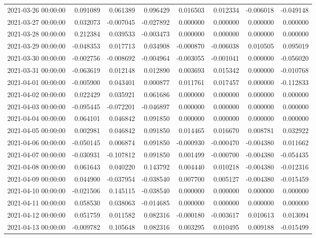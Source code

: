 \begin{tabular}{lrrrrrrr}
2021-03-26 00:00:00 & 0.091089 & 0.061389 & 0.096429 & 0.016503 & 0.012334 & -0.006018 & -0.049148 \\
2021-03-27 00:00:00 & 0.032073 & -0.007045 & -0.027892 & 0.000000 & 0.000000 & 0.000000 & 0.000000 \\
2021-03-28 00:00:00 & 0.212384 & 0.039533 & -0.003473 & 0.000000 & 0.000000 & 0.000000 & 0.000000 \\
2021-03-29 00:00:00 & -0.048353 & 0.017713 & 0.034908 & -0.000870 & -0.006038 & 0.010505 & 0.095019 \\
2021-03-30 00:00:00 & -0.002756 & -0.008692 & -0.004964 & -0.003055 & -0.001041 & 0.000000 & -0.056020 \\
2021-03-31 00:00:00 & -0.063619 & 0.012148 & 0.012890 & 0.003693 & 0.015342 & 0.000000 & -0.010768 \\
2021-04-01 00:00:00 & -0.005900 & 0.043401 & 0.000877 & 0.011761 & 0.017457 & 0.000000 & -0.112833 \\
2021-04-02 00:00:00 & 0.022429 & 0.035921 & 0.061686 & 0.000000 & 0.000000 & 0.000000 & 0.000000 \\
2021-04-03 00:00:00 & -0.095445 & -0.072201 & -0.046897 & 0.000000 & 0.000000 & 0.000000 & 0.000000 \\
2021-04-04 00:00:00 & 0.064101 & 0.046842 & 0.091850 & 0.000000 & 0.000000 & 0.000000 & 0.000000 \\
2021-04-05 00:00:00 & 0.002981 & 0.046842 & 0.091850 & 0.014465 & 0.016670 & 0.008781 & 0.032922 \\
2021-04-06 00:00:00 & -0.050145 & 0.006874 & 0.091850 & -0.000930 & -0.000470 & -0.004380 & 0.011662 \\
2021-04-07 00:00:00 & -0.030931 & -0.107812 & 0.091850 & 0.001499 & -0.000700 & -0.004380 & -0.054435 \\
2021-04-08 00:00:00 & 0.061643 & 0.040220 & 0.143792 & 0.004440 & 0.010218 & -0.004380 & -0.012316 \\
2021-04-09 00:00:00 & 0.044900 & -0.037954 & -0.038540 & 0.007700 & 0.005127 & -0.004380 & -0.015459 \\
2021-04-10 00:00:00 & -0.021506 & 0.145115 & -0.038540 & 0.000000 & 0.000000 & 0.000000 & 0.000000 \\
2021-04-11 00:00:00 & 0.058530 & 0.038063 & -0.014685 & 0.000000 & 0.000000 & 0.000000 & 0.000000 \\
2021-04-12 00:00:00 & 0.051759 & 0.011582 & 0.082316 & -0.000180 & -0.003617 & 0.010613 & 0.013094 \\
2021-04-13 00:00:00 & -0.009782 & 0.105648 & 0.082316 & 0.003295 & 0.010495 & 0.009188 & -0.015499 \\

\end{tabular}
